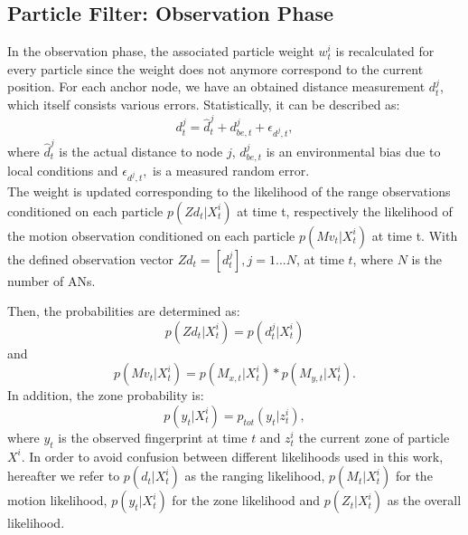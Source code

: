 \subsection{Particle Filter: Observation Phase}
In the observation phase, the associated particle weight $w^{i}_{t}$ is recalculated for every particle since the weight does not anymore correspond to the current position. For each anchor node, we have an obtained distance measurement $d^{j}_{t}$, which itself consists various errors. Statistically, it can be described as: 
\begin{equation}
d^{j}_{t} = \hat{d}^{j}_{t} + d^{j}_{be, t} + \epsilon_{d^{j}, t},
\label{eqn:distances}
\end{equation}
where $\hat{d}^{j}_{t}$ is the actual distance to node $j$, $d^{j}_{be, t}$ is an environmental bias due to local conditions and $\epsilon_{d^{j}, t},$ is a measured random error.\\
\noindent\hspace*{5mm}%
The weight is updated corresponding to the likelihood of the range observations conditioned on each particle $p(Zd_{t} | X^{i}_{t})$ at time t, respectively the likelihood of the motion observation conditioned on each particle $p(Mv_{t} | X^{i}_{t})$ at time t. With the defined observation vector $Zd_{t} = [d_{t}^{j}], j = 1...N$, at time $t$, where $N$ is the number of
ANs.


 Then, the probabilities are determined as:
\begin{equation}
p(Zd_{t} | X^{i}_{t}) = p(d_{t}^{j} | X^{i}_{t})
\label{eqn:probability_distance}
\end{equation}
and
\begin{equation}
p(Mv_{t} | X^{i}_{t}) = p(M_{x,t} | X^{i}_{t}) * p(M_{y,t} | X^{i}_{t}).
\label{eqn:probability_movement}
\end{equation}
In addition, the zone probability is:
\begin{equation}
p(y_t | X^{i}_{t}) = p_{tot}(y_{t} | z^{i}_{t}),
\label{eqn:probability_zone}
\end{equation}
where $y_t$ is the observed fingerprint at time $t$ and $z^{i}_{t}$ the current zone of particle $X^{i}$.
In order to avoid confusion between different likelihoods used in this work, hereafter we refer to $p(d_{t} | X^{i}_{t})$ as the ranging likelihood, $p(M_{t} | X^{i}_{t})$ for the motion likelihood, $p(y_t | X^{i}_{t})$ for the zone likelihood and $p(Z_{t} | X^{i}_{t})$ as the overall likelihood.


